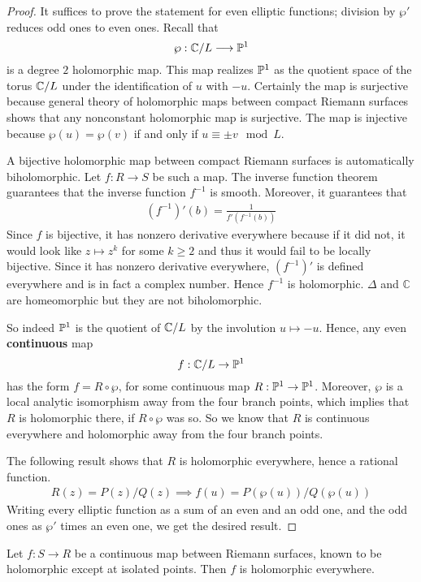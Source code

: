 \documentclass[12pt]{article}
\begin{document}
\begin{proof}
It suffices to prove the statement for even elliptic functions; division by $\wp'$ reduces odd ones to even ones. 
Recall that 
\[
\wp : \C/L \longrightarrow \P^1
\]
is a degree $2$ holomorphic map. 
This map realizes $\P^1$ as the quotient space of the torus $\C/L$ under the identification of $u$ with $-u$. Certainly the map is surjective because general theory of holomorphic maps between compact Riemann surfaces shows that any nonconstant holomorphic map is surjective. The map is injective because $\wp(u) = \wp(v)$ if and only if $u \equiv \pm v \mod L$. 

A bijective holomorphic map between compact Riemann surfaces is automatically biholomorphic.
Let $f:R \to S$ be such a map. The inverse function theorem guarantees that the inverse function $f^{-1}$ is smooth. Moreover, it guarantees that
    \begin{align*}
        (f^{-1})'(b) = \frac{1}{f'(f^{-1}(b))}
    \end{align*}
    Since $f$ is bijective, it has nonzero derivative everywhere because if it did not, it would look like $z\mapsto z^k$ for some $k\geq 2$ and thus it would fail to be locally bijective. Since it has nonzero derivative everywhere, $(f^{-1})'$ is defined everywhere and is in fact a complex number. Hence $f^{-1}$ is holomorphic. $\Delta$ and $\mathbb{C}$ are homeomorphic but they are not biholomorphic. 

So indeed $\P^1$ is the quotient of $\C/L$ by the involution $u \mapsto -u$. Hence, any even \textbf{continuous} map 
\[
f : \C/L \to \P^1
\]
has the form $f = R \circ \wp$, for some continuous map $R : \P^1 \to \P^1$. 
Moreover, $\wp$ is a local analytic isomorphism away from the four branch points, which implies that $R$ is holomorphic there, if $R \circ \wp$ was so. So we know that $R$ is continuous everywhere and holomorphic away from the four branch points. 

The following result shows that $R$ is holomorphic everywhere, hence a rational function. \begin{align*}
    R(z) = P(z)/Q(z) \implies f(u) = P(\wp(u))/Q(\wp(u))
\end{align*} Writing every elliptic function as a sum of an even and an odd one, and the odd ones as $\wp'$ times an even one, we get the desired result.
\end{proof}

\begin{proposition}
Let $f : S \to R$ be a continuous map between Riemann surfaces, known to be holomorphic except at isolated points. 
Then $f$ is holomorphic everywhere.
\end{proposition}
\end{document}
